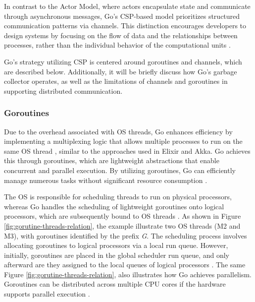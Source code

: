 In contrast to the Actor Model, where actors encapsulate state and communicate through asynchronous messages, Go’s \gls{CSP}-based model prioritizes structured communication patterns via channels. This distinction encourages developers to design systems by focusing on the flow of data and the relationships between processes, rather than the individual behavior of the computational units \cite{go-docs}.

Go's strategy utilizing \gls{CSP} is centered around goroutines and channels, which are described below. Additionally, it will be briefly discuss how Go's garbage collector operates, as well as the limitations of channels and goroutines in supporting distributed communication.

\subsubsection{Goroutines}

Due to the overhead associated with \gls{OS} threads, Go enhances efficiency by implementing a multiplexing logic that allows multiple processes to run on the same \gls{OS} thread \cite{Cox-Buday2017,Castro2019}, similar to the approaches used in Elixir and Akka. Go achieves this through goroutines, which are lightweight abstractions that enable concurrent and parallel execution. By utilizing goroutines, Go can efficiently manage numerous tasks without significant resource consumption \cite{go-docs}.

The \gls{OS} is responsible for scheduling threads to run on physical processors, whereas Go handles the scheduling of lightweight goroutines onto logical processors, which are subsequently bound to \gls{OS} threads \cite{Kennedy2016}. As shown in Figure \ref{fig:gorutine-threads-relation}, the example illustrate two \gls{OS} threads (M2 and M3), with goroutines identified by the prefix \textit{G}. The scheduling process involves allocating goroutines to logical processors via a local run queue. However, initially, goroutines are placed in the global scheduler run queue, and only afterward are they assigned to the local queues of logical processors \cite{Kennedy2016,Cox-Buday2017}. The same Figure \ref{fig:gorutine-threads-relation}, also illustrates how Go achieves parallelism. Goroutines can be distributed across multiple CPU cores if the hardware supports parallel execution \cite{Kennedy2016}.

